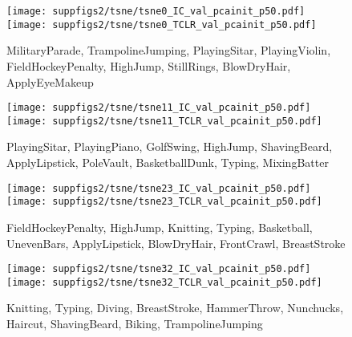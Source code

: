 \documentclass[10pt,twocolumn,letterpaper]{article}
\begin{document}
\begin{figure*}[h!]
\vspace{-2mm}
\centering
\begin{subfigure}[t]{0.49\textwidth}
    \texttt{[image: suppfigs2/tsne/tsne0\_IC\_val\_pcainit\_p50.pdf]}
    \texttt{[image: suppfigs2/tsne/tsne0\_TCLR\_val\_pcainit\_p50.pdf]}
    \caption{\textcolor{c0}{MilitaryParade}, \textcolor{c1}{TrampolineJumping}, \textcolor{c2}{PlayingSitar}, \textcolor{c3}{PlayingViolin}, \textcolor{c4}{FieldHockeyPenalty}, \textcolor{c5}{HighJump}, \textcolor{c6}{StillRings}, \textcolor{c7}{BlowDryHair}, \textcolor{c8}{ApplyEyeMakeup}}
\end{subfigure}
\hfill \begin{subfigure}[t]{0.49\textwidth}
    \texttt{[image: suppfigs2/tsne/tsne11\_IC\_val\_pcainit\_p50.pdf]}
    \texttt{[image: suppfigs2/tsne/tsne11\_TCLR\_val\_pcainit\_p50.pdf]}
    \caption{\textcolor{c0}{PlayingSitar}, \textcolor{c1}{PlayingPiano}, \textcolor{c2}{GolfSwing}, \textcolor{c3}{HighJump}, \textcolor{c4}{ShavingBeard}, \textcolor{c5}{ApplyLipstick}, \textcolor{c6}{PoleVault}, \textcolor{c7}{BasketballDunk}, \textcolor{c8}{Typing}, \textcolor{c9}{MixingBatter}}
\end{subfigure}
\begin{subfigure}[t]{0.49\textwidth}
    \texttt{[image: suppfigs2/tsne/tsne23\_IC\_val\_pcainit\_p50.pdf]}
    \texttt{[image: suppfigs2/tsne/tsne23\_TCLR\_val\_pcainit\_p50.pdf]}
    \caption{\textcolor{c0}{FieldHockeyPenalty}, \textcolor{c1}{HighJump}, \textcolor{c2}{Knitting}, \textcolor{c3}{Typing}, \textcolor{c4}{Basketball}, \textcolor{c5}{UnevenBars}, \textcolor{c6}{ApplyLipstick}, \textcolor{c7}{BlowDryHair}, \textcolor{c8}{FrontCrawl}, \textcolor{c9}{BreastStroke}}
\end{subfigure}
\hfill \begin{subfigure}[t]{0.49\textwidth}
    \texttt{[image: suppfigs2/tsne/tsne32\_IC\_val\_pcainit\_p50.pdf]}
    \texttt{[image: suppfigs2/tsne/tsne32\_TCLR\_val\_pcainit\_p50.pdf]}
    \caption{\textcolor{c0}{Knitting}, \textcolor{c1}{Typing}, \textcolor{c2}{Diving}, \textcolor{c3}{BreastStroke}, \textcolor{c4}{HammerThrow}, \textcolor{c5}{Nunchucks}, \textcolor{c6}{Haircut}, \textcolor{c7}{ShavingBeard}, \textcolor{c8}{Biking}, \textcolor{c9}{TrampolineJumping}}

\end{subfigure}
\end{figure*}
\end{document}

